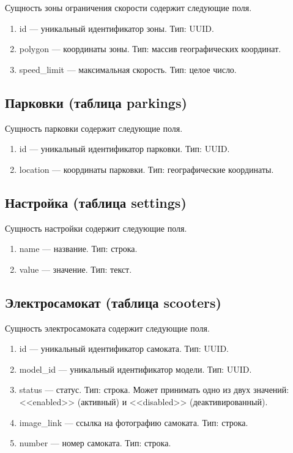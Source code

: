 Сущность зоны ограничения скорости содержит следующие поля.

\begin{enumerate}
    \item id --- уникальный идентификатор зоны. Тип: UUID. 
    \item polygon --- координаты зоны. Тип: массив географических координат.
    \item speed\_limit --- максимальная скорость. Тип: целое число.
\end{enumerate}

\subsection{Парковки (таблица parkings)}

Сущность парковки содержит следующие поля.

\begin{enumerate}
    \item id --- уникальный идентификатор парковки. Тип: UUID.
    \item location --- координаты парковки. Тип: географические координаты.
\end{enumerate}

\subsection{Настройка (таблица settings)}

Сущность настройки содержит следующие поля.

\begin{enumerate}
    \item name --- название. Тип: строка.
    \item value --- значение. Тип: текст.
\end{enumerate}

\subsection{Электросамокат (таблица scooters)}

Сущность электросамоката содержит следующие поля.

\begin{enumerate}
    \item id --- уникальный идентификатор самоката. Тип: UUID.
    \item model\_id --- уникальный идентификатор модели. Тип: UUID.
    \item status --- статус. Тип: строка. Может принимать одно из двух значений: <<enabled>> (активный) и <<disabled>> (деактивированный).
    \item image\_link --- ссылка на фотографию самоката. Тип: строка.
    \item number --- номер самоката. Тип: строка.
\end{enumerate}

